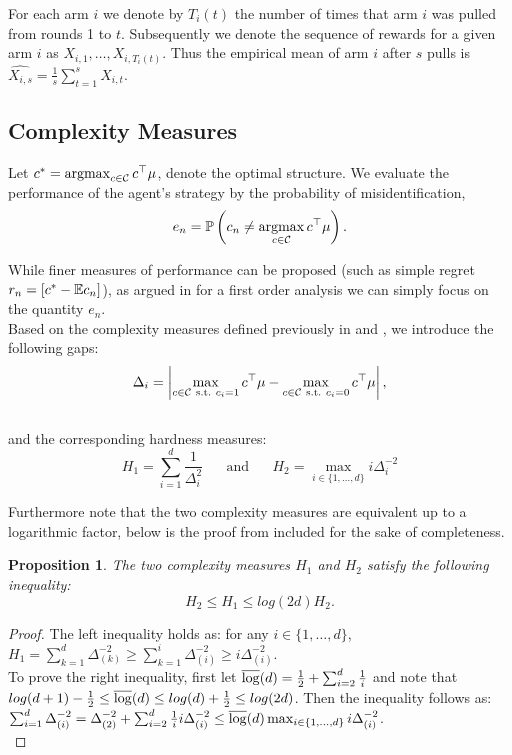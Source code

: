 \documentclass[11.75pt,oneside]{amsart}
\newtheorem{prop}[thm]{Proposition}
\begin{document}
For each arm $i$ we denote by $T_i(t)$ the number of times that arm $i$ was pulled from rounds 1 to $t$. Subsequently we denote the sequence of rewards for a given arm $i$ as $X_{i,1}, \hdots, X_{i,T_i(t)}$. Thus the empirical mean of arm $i$ after $s$ pulls is $\widehat{X_{i,s}} = \frac{1}{s}\sum_{t=1}^s X_{i,t}$.\\

\subsection{Complexity Measures}

Let $c^* = \mathop{\mathrm{argmax}}_{c \in \mathcal{C}} c^{\top} \mu$, denote the optimal structure. We evaluate the performance of the agent's strategy by the probability of misidentification, 
$$e_n = \mathbb{P}\left( c_n \neq \mathop{\mathrm{argmax}}_{c \in \mathcal{C}} c^{\top} \mu\right).$$

While finer measures of performance can be proposed (such as simple regret $r_{n} = [c^*-\mathbb{E} c_{n}]$), as argued in \cite{ABM10} for a first order analysis we can simply focus on the quantity $e_n$.\\

Based on the complexity measures defined previously in \cite{ABM10} and \cite{BWV13}, we introduce the following gaps:
$$\Delta_i = \left|\max_{c \in \cC \ \text{s.t.} \ c_i = 1} c^{\top} \mu - \max_{c \in \cC \ \text{s.t.} \ c_i = 0} c^{\top} \mu\right| ,$$
\\
and the corresponding hardness measures:
$$H_1 = \sum_{i=1}^d \frac1{\Delta_i^2} \hspace{20pt}  \textrm{and}  \hspace{20pt} H_2 = \max_{i \in \{1, \hdots, d\}} i\Delta_i^{-2}$$

Furthermore note that the two complexity measures are equivalent up to a logarithmic factor, below is the proof from \cite{ABM10} included for the sake of completeness.
\begin{prop} The two complexity measures $H_1$ and $H_2$ satisfy the following inequality:
$$ H_2 \le H_1 \le log(2d)H_2. $$
\end{prop}
\begin{proof}
The left inequality holds as: for any $i \in \{1, \hdots, d\}$, $H_1 = \sum_{k=1}^d \Delta^{-2}_{(k)} \ge \sum_{k=1}^i \Delta^{-2}_{(i)} \ge i\Delta^{-2}_{(i)}$.\\
\vspace{5pt}
To prove the right inequality, first let $\overline{\log}(d) = \frac{1}{2} + \sum_{i=2}^d\frac{1}{i}$ and note that $log(d+1) - \frac{1}{2} \le \overline{\log}(d) \le log(d) + \frac{1}{2} \le log(2d)$.
Then the inequality follows as: $\sum_{i=1}^d \Delta^{-2}_{(i)} = \Delta^{-2}_{(2)} + \sum_{i=2}^d \frac{1}{i} i\Delta^{-2}_{(i)} \le \overline{\log}(d) \max_{i \in \{1, \hdots, d\}} i\Delta^{-2}_{(i)}$.\\
\end{proof}
\end{document}
